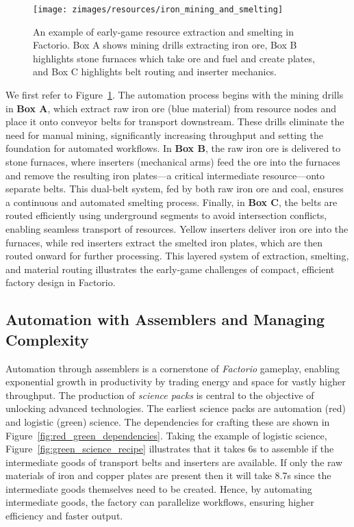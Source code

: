 \begin{figure}[ht]
    \centering
    \texttt{[image: zimages/resources/iron\_mining\_and\_smelting]} %
    \caption{An example of early-game resource extraction and smelting in Factorio. Box A shows mining drills extracting iron ore, Box B highlights stone furnaces which take ore and fuel and create plates, and Box C highlights belt routing and inserter mechanics. \cite{ironMiningSmelting}}
    \label{fig:iron_smelting}
\end{figure}
We first refer to Figure~\ref{fig:iron_smelting}. The automation process begins with the mining drills in \textbf{Box A}, which extract raw iron ore (blue material) from resource nodes and place it onto conveyor belts for transport downstream. These drills eliminate the need for manual mining, significantly increasing throughput and setting the foundation for automated workflows. In \textbf{Box B}, the raw iron ore is delivered to stone furnaces, where inserters (mechanical arms) feed the ore into the furnaces and remove the resulting iron plates—a critical intermediate resource—onto separate belts. This dual-belt system, fed by both raw iron ore and coal, ensures a continuous and automated smelting process. Finally, in \textbf{Box C}, the belts are routed efficiently using underground segments to avoid intersection conflicts, enabling seamless transport of resources. Yellow inserters deliver iron ore into the furnaces, while red inserters extract the smelted iron plates, which are then routed onward for further processing. This layered system of extraction, smelting, and material routing illustrates the early-game challenges of compact, efficient factory design in Factorio.


\subsection{Automation with Assemblers and Managing Complexity}
Automation through assemblers is a cornerstone of \textit{Factorio} gameplay, enabling exponential growth in productivity by trading energy and space for vastly higher throughput. The production of \textit{science packs} is central to the objective of unlocking advanced technologies. The earliest science packs are automation (red) and logistic (green) science. The dependencies for crafting these are shown in Figure~\ref{fig:red_green_dependencies}. Taking the example of logistic science, Figure~\ref{fig:green_science_recipe} illustrates that it takes 6s to assemble if the intermediate goods of transport belts and inserters are available. If only the raw materials of iron and copper plates are present then it will take 8.7s since the intermediate goods themselves need to be created. Hence, by automating intermediate goods, the factory can parallelize workflows, ensuring higher efficiency and faster output. 

